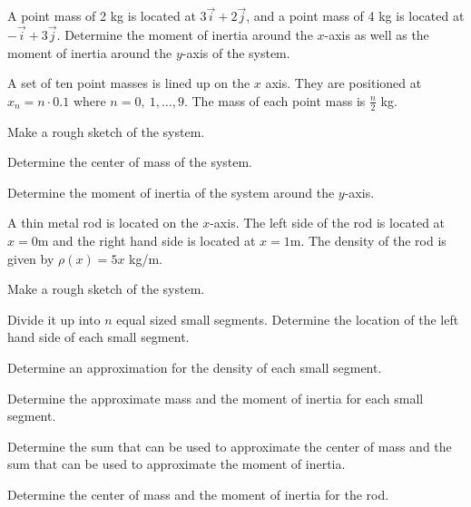 
\begin{problem}
\item A point mass of 2 kg is located at $3\vec{i} + 2\vec{j}$, and a
  point mass of 4 kg is located at $-\vec{i}+3\vec{j}$. Determine the
  moment of inertia around the $x$-axis as well as the moment of
  inertia around the $y$-axis  of the system.

  \vfill

  \clearpage


\item A set of ten point masses is lined up on the $x$ axis. They are
  positioned at $x_n=n\cdot 0.1$ where $n=0,~1,\ldots,9$. The mass of
  each point mass is $\frac{n}{2}$ kg.
  \begin{subproblem}
    \item Make a rough sketch of the system.
      \vfill
    \item Determine the center of mass of the system.
      \vfill
    \item Determine the moment of inertia of the system around the
      $y$-axis.
      \vfill
  \end{subproblem}


\end{problem}


\begin{problem}
\item A thin metal rod is located on the $x$-axis. The left side of
  the rod is located at $x=0$m and the right hand side is located at
  $x=1$m. The density of the rod is given by $\rho(x)=5x$ kg/m.
  \begin{subproblem}
    \item Make a rough sketch of the system.
      \vfill
    \item Divide it up into $n$ equal sized small segments. Determine
      the location of the left hand side of each small segment.
      \vfill
    \item Determine an approximation for the density of each small
      segment.
      \vfill
    \item Determine the approximate mass and the moment of inertia for
      each small segment.  
      \vfill

      \clearpage

    \item Determine the sum that can be used to approximate the center
      of mass and the sum that can be used to approximate the moment
      of inertia.

      \vspace{5em}

    \item Determine the center of mass and the moment of inertia for
      the rod.

      \vfill

  \end{subproblem}
\end{problem}

